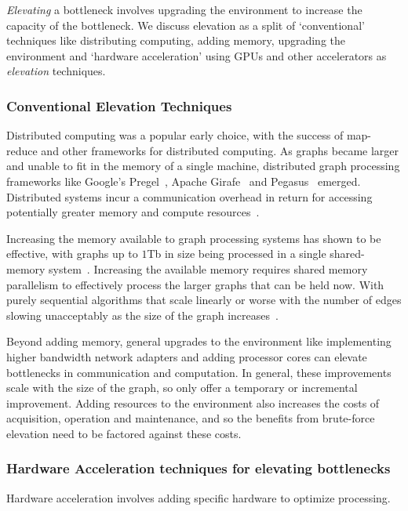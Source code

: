 \textit{Elevating} a bottleneck involves upgrading the environment to increase the capacity of the bottleneck.
We discuss elevation as a split of `conventional' techniques like distributing computing, adding memory, upgrading the environment and `hardware acceleration' using GPUs and other accelerators as \textit{elevation} techniques.

\subsubsection{Conventional Elevation Techniques}
Distributed computing was a popular early choice, with the success of map-reduce and other frameworks for distributed computing. 
As graphs became larger and unable to fit in the memory of a single machine, distributed graph processing frameworks like Google's Pregel~\cite{Malewicz2010}, Apache Girafe~\cite{Sakr2016} and Pegasus~\cite{Kang2009} emerged. 
Distributed systems incur a communication overhead in return for accessing potentially greater memory and compute resources~\cite{Shun2013, Beamer2015}.

Increasing the memory available to graph processing systems has shown to be effective, with graphs up to $1$Tb in size being processed in a single shared-memory system~\cite{Dhulipala2021}.
Increasing the available memory requires shared memory parallelism to effectively process the larger graphs that can be held now.
With purely sequential algorithms that scale linearly or worse with the number of edges slowing unacceptably as the size of the graph increases~\cite{Hong2012}.

Beyond adding memory, general upgrades to the environment like implementing higher bandwidth network adapters and adding processor cores can elevate bottlenecks in communication and computation.
In general, these improvements scale with the size of the graph, so only offer a temporary or incremental improvement. 
Adding resources to the environment also increases the costs of acquisition, operation and maintenance, and so the benefits from brute-force elevation need to be factored against these costs. 

\subsubsection{Hardware Acceleration techniques for elevating bottlenecks}
Hardware acceleration involves adding specific hardware to optimize processing. 

